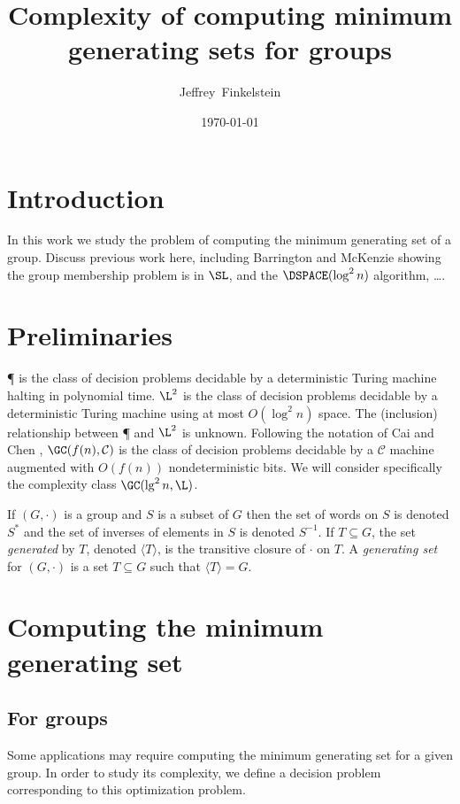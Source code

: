 \documentclass{article}
\title{Complexity of computing minimum generating sets for groups}
\author{Jef{}frey~Finkelstein}
\date{\today}
\newcommand{\gen}[1]{{\langle #1 \rangle}}
\begin{document}
\maketitle

\section{Introduction}

In this work we study the problem of computing the minimum generating set of a group.
Discuss previous work here, including Barrington and McKenzie showing the group membership problem is in $\SL$, and the $\DSPACE(\log^2 n)$ algorithm, \ldots.

\section{Preliminaries}

\P{} is the class of decision problems decidable by a deterministic Turing machine halting in polynomial time.
$\L^2$ is the class of decision problems decidable by a deterministic Turing machine using at most $O(\log^2 n)$ space.
The (inclusion) relationship between \P{} and $\L^2$ is unknown.
Following the notation of Cai and Chen \cite{cc97}, $\GC(f(n), \mathcal{C})$ is the class of decision problems decidable by a $\mathcal{C}$ machine augmented with $O(f(n))$ nondeterministic bits.
We will consider specifically the complexity class $\GC(\lg^2 n, \L)$.

If $(G, \cdot)$ is a group and $S$ is a subset of $G$ then the set of words on $S$ is denoted $S^*$ and the set of inverses of elements in $S$ is denoted $S^{-1}$.
If $T \subseteq G$, the set \emph{generated} by $T$, denoted $\gen{T}$, is the transitive closure of $\cdot$ on $T$.
A \emph{generating set} for $(G, \cdot)$ is a set $T \subseteq G$ such that $\gen{T} = G$.

\section{Computing the minimum generating set}

\subsection{For groups}

Some applications may require computing the minimum generating set for a given group.
In order to study its complexity, we define a decision problem corresponding to this optimization problem.
\end{document}
